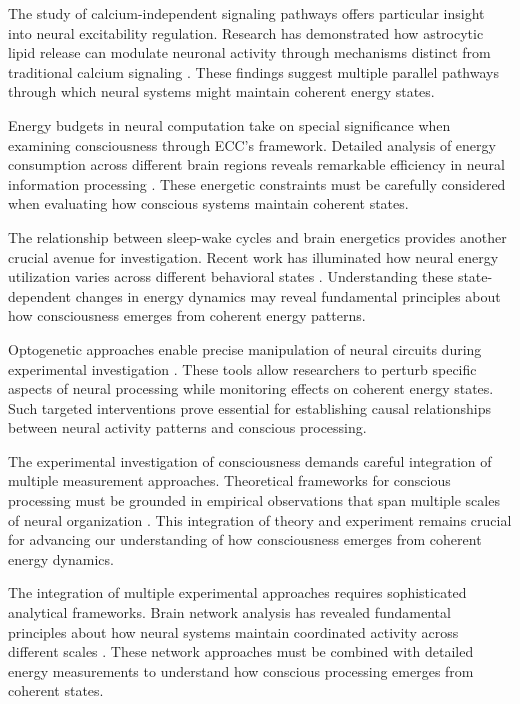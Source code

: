 The study of calcium-independent signaling pathways offers particular insight into neural excitability regulation. Research has demonstrated how astrocytic lipid release can modulate neuronal activity through mechanisms distinct from traditional calcium signaling \cite{Chow2020}. These findings suggest multiple parallel pathways through which neural systems might maintain coherent energy states.

Energy budgets in neural computation take on special significance when examining consciousness through ECC's framework. Detailed analysis of energy consumption across different brain regions reveals remarkable efficiency in neural information processing \cite{Bezaires2013}. These energetic constraints must be carefully considered when evaluating how conscious systems maintain coherent states.

The relationship between sleep-wake cycles and brain energetics provides another crucial avenue for investigation. Recent work has illuminated how neural energy utilization varies across different behavioral states \cite{DiNuzzo2017}. Understanding these state-dependent changes in energy dynamics may reveal fundamental principles about how consciousness emerges from coherent energy patterns.

Optogenetic approaches enable precise manipulation of neural circuits during experimental investigation \cite{Yizhar2011}. These tools allow researchers to perturb specific aspects of neural processing while monitoring effects on coherent energy states. Such targeted interventions prove essential for establishing causal relationships between neural activity patterns and conscious processing.

The experimental investigation of consciousness demands careful integration of multiple measurement approaches. Theoretical frameworks for conscious processing must be grounded in empirical observations that span multiple scales of neural organization \cite{Dehaene2011}. This integration of theory and experiment remains crucial for advancing our understanding of how consciousness emerges from coherent energy dynamics.

The integration of multiple experimental approaches requires sophisticated analytical frameworks. Brain network analysis has revealed fundamental principles about how neural systems maintain coordinated activity across different scales \cite{Bassett2017}. These network approaches must be combined with detailed energy measurements to understand how conscious processing emerges from coherent states.

